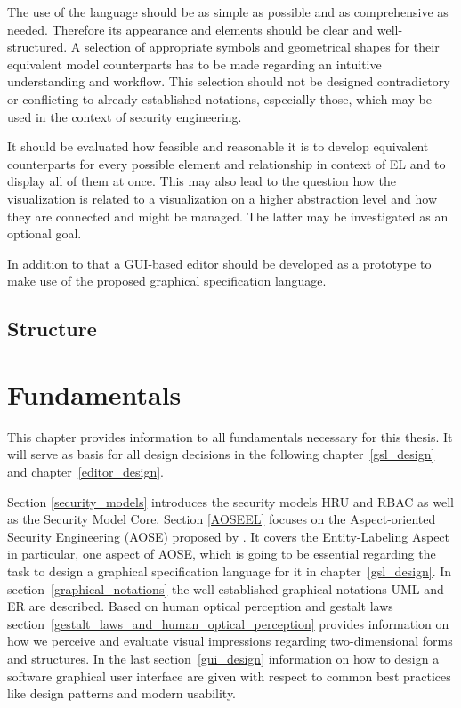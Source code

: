 \documentclass[twoside, openright, 12pt]{book}
\begin{document}
The use of the language should be as simple as possible and as comprehensive as needed.
Therefore its appearance and elements should be clear and well-structured.
A selection of appropriate symbols and geometrical shapes for their equivalent model counterparts has to be made regarding an intuitive understanding and workflow.
This selection should not be designed contradictory or conflicting to already established notations, especially those, which may be used in the context of security engineering.

It should be evaluated how feasible and reasonable it is to develop equivalent counterparts for every possible element and relationship in context of EL and to display all of them at once.
This may also lead to the question how the visualization is related to a visualization on a higher abstraction level and how they are connected and might be managed.
The latter may be investigated as an optional goal.

In addition to that a GUI-based editor should be developed as a prototype to make use of the proposed graphical specification language.



\section{Structure}
\label{structure}




\cleardoublepage
\chapter{Fundamentals}
\label{fundamentals}
This chapter provides information to all fundamentals necessary for this thesis.
It will serve as basis for all design decisions in the following chapter~\ref{gsl_design} and chapter~\ref{editor_design}.

Section \ref{security_models} introduces the security models HRU and RBAC as well as the Security Model Core.
Section \ref{AOSEEL} focuses on the Aspect-oriented Security Engineering (AOSE) proposed by \citet*{Amthor18}.
It covers the Entity-Labeling Aspect in particular, one aspect of AOSE, which is going to be essential regarding the task to design a graphical specification language for it in chapter~\ref{gsl_design}.
In section~\ref{graphical_notations} the well-established graphical notations UML and ER are described.
Based on human optical perception and gestalt laws section~\ref{gestalt_laws_and_human_optical_perception} provides information on how we perceive and evaluate visual impressions regarding two-dimensional forms and structures.
In the last section~\ref{gui_design} information on how to design a software graphical user interface are given with respect to common best practices like design patterns and modern usability.
\end{document}
